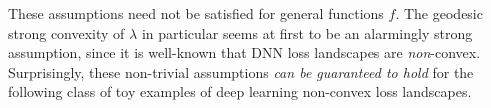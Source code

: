 \documentclass{article}
\newcommand{\RB}{\mathbb{R}}
\theoremstyle{plain}
\theoremstyle{definition}
\newtheorem{assumption}[theorem]{Assumption}
\theoremstyle{remark}
\begin{document}

These assumptions need not be satisfied for general functions $f$. The geodesic strong convexity of $\lambda$ in particular seems at first to be an alarmingly strong assumption, since it is well-known that DNN loss landscapes are \emph{non}-convex.  Surprisingly, these non-trivial assumptions \emph{can be guaranteed to hold} for the following class of toy examples of deep learning non-convex loss landscapes.
\end{document}
